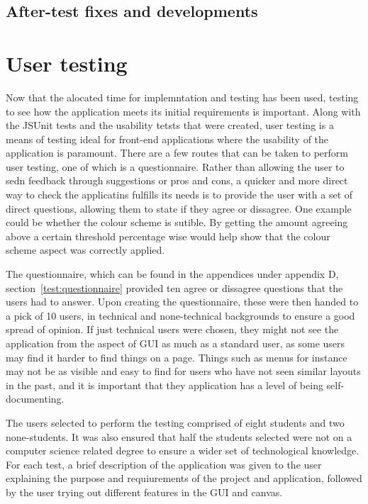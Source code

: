 \subsection{After-test fixes and developments}


\section{User testing}
Now that the alocated time for implemntation and testing has been used, testing to see how the application meets its initial requirements is important. Along with the JSUnit tests and the usability tetsts that were created, user testing is a means of testing ideal for front-end applications where the usability of the application is paramount. There are a few routes that can be taken to perform user testing, one of which is a questionnaire. Rather than allowing the user to sedn feedback through suggestions or pros and cons, a quicker and more direct way to check the applicatins fulfills its needs is to provide the user with a set of direct questions, allowing them to state if they agree or dissagree. One example could be whether the colour scheme is sutible. By getting the amount agreeing above a certain threshold percentage wise would help show that the colour scheme aspect was correctly applied.

The questionnaire, which can be found in the appendices under appendix D, section~\ref{test:questionnaire} provided ten agree or dissagree questions that the users had to answer. Upon creating the questionnaire, these were then handed to a pick of 10 users, in technical and none-technical backgrounds to ensure a good spread of opinion. If just technical users were chosen, they might not see the application from the aspect of GUI as much as a standard user, as some users may find it harder to find things on a page. Things such as menus for instance may not be as visible and easy to find for users who have not seen similar layouts in the past, and it is important that they application has a level of being self-documenting.

The users selected to perform the testing comprised of eight students and two none-students. It was also ensured that half the students selected were not on a computer science related degree to ensure a wider set of technological knowledge. For each test, a brief description of the application was given to the user explaining the purpose and requiurements of the project and application, followed by the user trying out different features in the GUI and canvas. 

